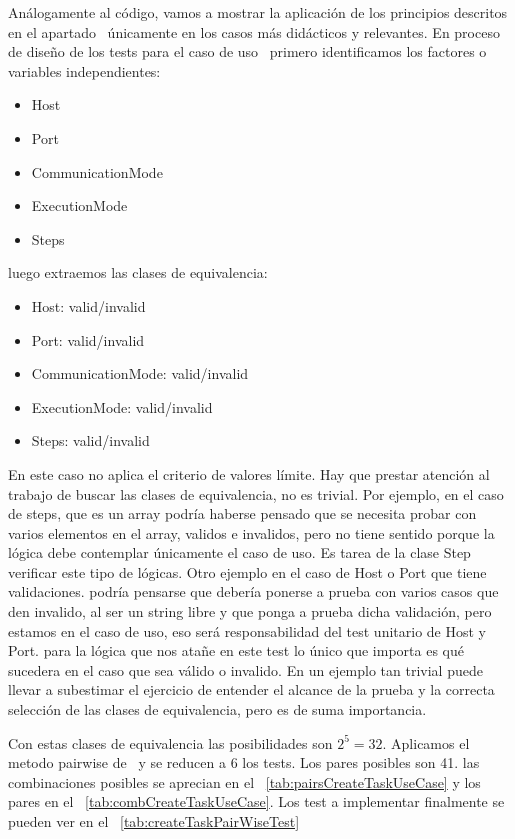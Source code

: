 
Análogamente al código, vamos a mostrar la aplicación de los principios descritos en el apartado~ únicamente en los casos más didácticos y relevantes.
En proceso de diseño de los tests para el caso de uso~ primero identificamos los factores o variables independientes:

\begin{itemize}
    \item Host
    \item Port
    \item CommunicationMode
    \item ExecutionMode
    \item Steps
\end{itemize}

luego extraemos las clases de equivalencia:

\begin{itemize}
    \item Host: valid/invalid
    \item Port: valid/invalid
    \item CommunicationMode: valid/invalid
    \item ExecutionMode: valid/invalid
    \item Steps: valid/invalid
\end{itemize}

En este caso no aplica el criterio de valores límite.
Hay que prestar atención al trabajo de buscar las clases de equivalencia, no es trivial.
Por ejemplo, en el caso de steps, que es un array podría haberse pensado que se necesita probar con varios elementos en el array, validos e invalidos, pero no tiene sentido porque la lógica debe contemplar únicamente el caso de uso.
Es tarea de la clase Step verificar este tipo de lógicas.
Otro ejemplo en el caso de Host o Port que tiene validaciones.
podría pensarse que debería ponerse a prueba con varios casos que den invalido, al ser un string libre y que ponga a prueba dicha validación, pero estamos en el caso de uso, eso será responsabilidad del test unitario de Host y Port.
para la lógica que nos atañe en este test lo único que importa es qué sucedera en el caso que sea válido o invalido.
En un ejemplo tan trivial puede llevar a subestimar el ejercicio de entender el alcance de la prueba y la correcta selección de las clases de equivalencia, pero es de suma importancia.

Con estas clases de equivalencia las posibilidades son $2^5 = 32$.
Aplicamos el metodo pairwise de~ y se reducen a 6 los tests.
Los pares posibles son 41.
las combinaciones posibles se aprecian en el ~\cref{tab:pairsCreateTaskUseCase} y los pares en el ~\cref{tab:combCreateTaskUseCase}.
Los test a implementar finalmente se pueden ver en el ~\cref{tab:createTaskPairWiseTest}

